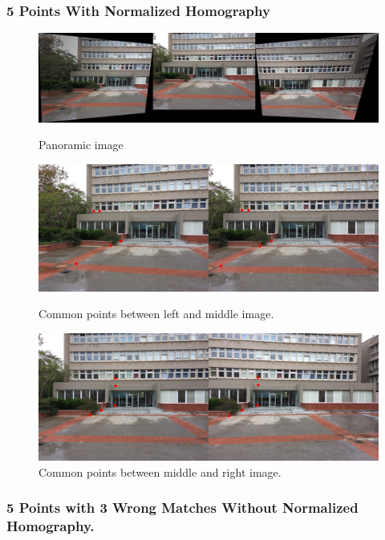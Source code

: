 \documentclass[letterpaper,12pt]{article}
\begin{document}
\subsubsection{5 Points With Normalized Homography}
\begin{figure}[!htb]
        \centering\includegraphics[width=1\columnwidth]{experiments/5points/norm/finalNonewrong.jpg}
          \caption{
                \label{} Panoramic image
        }
        \centering\includegraphics[width=1\columnwidth]{experiments/5points/norm/left-1_middleNonewrong.jpg}
          \caption{
                \label{} Common points between left and middle image.
        }
        \centering\includegraphics[width=1\columnwidth]{experiments/5points/norm/middle_left-1Nonewrong.jpg}
        \caption{
                \label{} Common points between middle and right image.
        }
\end{figure}

\FloatBarrier

\newpage
\subsubsection{5 Points with 3 Wrong Matches Without Normalized Homography.}
\end{document}
